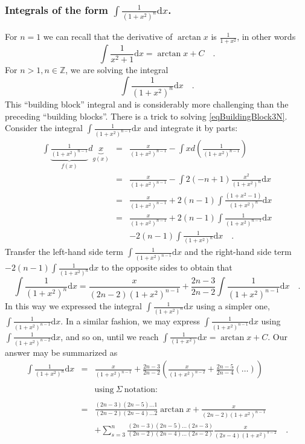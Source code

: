 \documentclass[12pt]{book}
\newcommand{\diff}{\text{d}}
\begin{document}
\subsubsection {Integrals of the form $\displaystyle\int \frac{1}{(1+x ^2)^n} \diff x $.}
For $n=1$ we can recall that the derivative of $\arctan x$ is $\displaystyle\frac{1}{1+x^2}$, in other words
\[
\int \frac{1}{x^2+1}\diff x= \arctan x+C\quad .
\]
For $n>1, n\in \mathbb Z$, we are solving the integral
\begin{equation}\label{eqBuildingBlock3N}
\int \frac{1}{(1+x ^2)^n}\diff x\quad .
\end{equation}
This ``building block'' integral and is considerably more challenging than the preceding ``building blocks''. There is a trick to solving \eqref{eqBuildingBlock3N}. Consider the integral $\displaystyle\int \frac{1}{(1+x ^2)^{n-1}}\diff x$ and integrate it by parts:
\[
\begin{array}{rcl}
\displaystyle \int \underbrace{\frac{1}{(1+x ^2)^{n-1}}}_{f(x)}d\underbrace{x}_{g(x)}&=&\displaystyle \frac{x}{(1+x ^2)^{n-1}}-\int x d\left(\frac{1}{(1+x ^2)^{n-1}}\right)\\
&=&\displaystyle\frac{x}{(1+x ^2)^{n-1}}- \int 2(-n+1)\frac{x^2}{(1+x^2)^n}\diff x\\
&=&\displaystyle\frac{x}{(1+x ^2)^{n-1}}+2(n-1) \int \frac{(1+x^2-1)}{(1+x^2)^n}\diff x\\
&=&\displaystyle\frac{x}{(1+x ^2)^{n-1}} +2(n-1)\int \frac{1}{(1+x^2)^{n-1}}\diff x \\&&\displaystyle -2(n-1) \int \frac{1}{(1+x^2)^n}\diff x\quad .
\end{array}
\]
Transfer the left-hand side term $\displaystyle\int \frac{1}{(1+x^2)^{n-1}}\diff x$ and the right-hand side term  $\displaystyle -2(n-1) \int \frac{1}{(1+x^2)^n}\diff x$ to the opposite sides to obtain that 
\[
\int \frac{1}{(1+x^2)^n}\diff x= \frac{x}{(2n-2)(1+x ^2)^{n-1}}+ \frac{2n-3}{2n-2}\int \frac{1}{(1+x^2)^{n-1}}\diff x\quad .
\]
In this way we expressed the integral $\displaystyle\int \frac{1}{(1+x^2)^n}\diff x$ using a simpler one, $\displaystyle\int \frac{1}{(1+x^2)^{n-1}}\diff x$. In a similar fashion, we may express $\displaystyle\int \frac{1}{(1+x^2)^{n-1}}\diff x$ using $\displaystyle\int \frac{1}{(1+x^2)^{n-2}}\diff x$, and so on, until we reach $\displaystyle\int \frac{1}{(1+x^2)}\diff x=\arctan x +C$. Our answer may be summarized as
\[
\begin{array}{rcl}
\displaystyle \int \frac{1}{(1+x^2)^n}\diff x&=& \displaystyle  \frac{x}{(1+x ^2)^{n-1}}+\frac{2n-3}{2n-2}\left(\frac{x}{(1+x^2)^{n-2}}+\frac{2n-5}{2n-4}\left(\dots\right)\right)\\ \\ &&\mathrm{using~}\Sigma \mathrm{~notation:}\\ \\
&=&\displaystyle \frac{(2n-3 )(2n-5)\dots 1}{(2n-2)(2n-4)\dots 2}\arctan x+  \frac{x}{(2n-2)(1+x ^2)^{n-1}} \\&&\displaystyle + \sum_{s=3}^{n} \frac{(2n-3 )(2n-5)\dots (2s-3)}{(2n-2)(2n-4)\dots (2s-2)} \frac{x}{(2s-4)(1+x^2)^{s-2}} \quad .
\end{array}
\]
\end{document}
